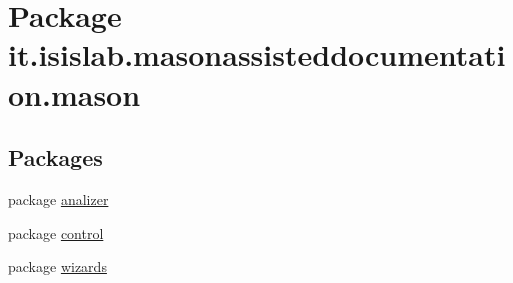 \hypertarget{namespaceit_1_1isislab_1_1masonassisteddocumentation_1_1mason}{\section{Package it.\-isislab.\-masonassisteddocumentation.\-mason}
\label{namespaceit_1_1isislab_1_1masonassisteddocumentation_1_1mason}
}
\subsection*{Packages}
\begin{DoxyCompactItemize}
\item 
package \hyperlink{namespaceit_1_1isislab_1_1masonassisteddocumentation_1_1mason_1_1analizer}{analizer}
\item 
package \hyperlink{namespaceit_1_1isislab_1_1masonassisteddocumentation_1_1mason_1_1control}{control}
\item 
package \hyperlink{namespaceit_1_1isislab_1_1masonassisteddocumentation_1_1mason_1_1wizards}{wizards}
\end{DoxyCompactItemize}
